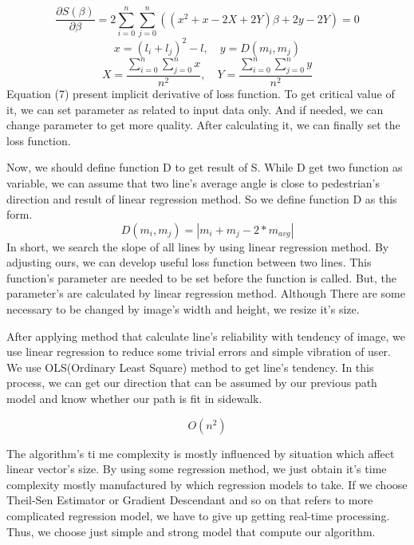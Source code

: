 \begin{equation}
\mathit{\frac{\partial S(\beta)}{\partial \beta} =2 \sum_{i=0}^{n}{\sum_{j=0}^{n}{((x^{2}+x-2X+2Y)\beta + 2y-2Y)}}=0} 
\end{equation}
\begin{equation}
\mathit{x = (l_{i}+l_{j})^2 - l,\quad y = D(m_{i},m_{j})}
\end{equation}
\begin{equation}
\mathit{X=\frac{\sum_{i=0}^{n}{\sum_{j=0}^{n}}{x}}{n^{2}},\quad Y=\frac{\sum_{i=0}^{n}{\sum_{j=0}^{n}{y}}}{n^{2}}}
\end{equation}
Equation (7) present implicit derivative of loss function. To get critical value of it, we can set parameter as related to input data only. And if needed, we can change parameter to get more quality.  After calculating it, we can finally set the loss function. 

Now, we should define function D to get result of S. While D get two function as variable, we can assume that two line's average angle is close to pedestrian's direction and result of linear regression method. So we define function D as this form.
\begin{equation}
\mathit{D(m_{i},m_{j}) = |m_i + m_j - 2 *m_{avg}|}
\end{equation} 
In short, we search the slope of all lines by using linear regression method. By adjusting ours, we can develop useful loss function between two lines. This function's parameter are needed to be set before the function is called. But, the parameter's are calculated by linear regression method. Although There are some necessary to be changed by image's width and height, we resize it's size.\quad
 
After applying method that calculate line's reliability with tendency of image, we use linear regression to reduce some trivial errors and simple vibration of user. We use OLS(Ordinary Least Square) method to get line's tendency. In this process, we can get our direction that can be assumed by our previous path model and know whether our path is fit in sidewalk. 

\begin{equation}
\mathit{O(n^2)}
\end{equation}

The algorithm's ti	me complexity is mostly influenced by situation which affect linear vector's size. By using some regression method, we just obtain it's time complexity mostly manufactured by which regression models to take. If we choose Theil-Sen Estimator or Gradient Descendant and so on that refers to more complicated regression model, we have to give up getting real-time processing. Thus, we choose just simple and strong model that compute our algorithm.

